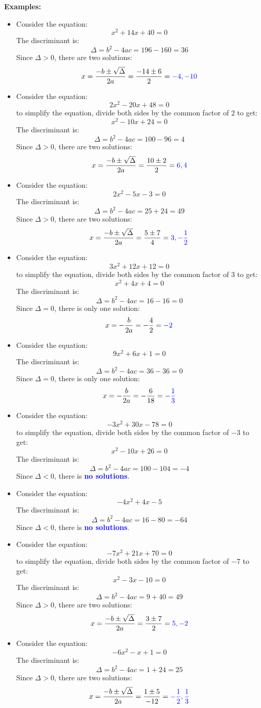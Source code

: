 \documentclass{article}
\newcommand{\dg}[1]{\textcolor{dark_green}{#1}}
\newcommand{\blue}[1]{\textcolor{blue}{#1}}
\begin{document}
\textbf{Examples:}
\begin{itemize}
\item Consider the equation:
\dg{\[x^2 + 14x + 40 = 0\]}
The discriminant is: 
\[\Delta = b^2 - 4ac = 196 - 160 = 36\]
Since \(\Delta > 0\), there are two solutions:
\[x = \frac{-b \pm \sqrt{\Delta}}{2a} = \frac{-14 \pm 6}{2} = \blue{-4, -10}\]
\item Consider the equation:
\dg{\[2x^2 - 20x + 48 = 0\]}
to simplify the equation, divide both sides by the common factor of \(2\) to get:
\[x^2 - 10x + 24 = 0\]
The discriminant is: 
\[\Delta = b^2 - 4ac = 100 - 96 = 4\]
Since \(\Delta > 0\), there are two solutions:
\[x = \frac{-b \pm \sqrt{\Delta}}{2a} = \frac{10 \pm 2}{2} = \blue{6, 4}\]
\item Consider the equation:
\dg{\[2x^2 - 5x - 3 = 0\]}
The discriminant is:
\[\Delta = b^2 - 4ac = 25 + 24 = 49\]
Since \(\Delta > 0\), there are two solutions:
\[x = \frac{-b \pm \sqrt{\Delta}}{2a} = \frac{5 \pm 7}{4} = \blue{3, -\frac{1}{2}}\]
\item Consider the equation:
\dg{\[3x^2 + 12x + 12 = 0\]}
to simplify the equation, divide both sides by the common factor of \(3\) to get:
\[x^2 + 4x + 4 = 0\]
The discriminant is:
\[\Delta = b^2 - 4ac = 16 - 16 = 0\]
Since \(\Delta = 0\), there is only one solution:
\[x = -\frac{b}{2a} = -\frac{4}{2} = \blue{-2}\]
\item Consider the equation:
\dg{\[9x^2 + 6x + 1 = 0\]}
The discriminant is:
\[\Delta = b^2 - 4ac = 36 - 36 = 0\]
Since \(\Delta = 0\), there is only one solution:
\[x = -\frac{b}{2a} = -\frac{6}{18} = \blue{-\frac{1}{3}}\]
\item Consider the equation:
\dg{\[-3x^2 + 30x - 78 = 0\]}
to simplify the equation, divide both sides by the common factor of \(-3\) to get:
\[x^2 - 10x + 26 = 0\]
The discriminant is:
\[\Delta = b^2 - 4ac = 100 - 104 = -4\]
Since \(\Delta < 0\), there is \blue{{\bf no solutions}}.
\item Consider the equation:
\dg{\[-4x^2 + 4x - 5\]}
The discriminant is:
\[\Delta = b^2 - 4ac = 16 - 80 = -64\]
Since \(\Delta < 0\), there is \blue{{\bf no solutions}}.
\item Consider the equation:
\dg{\[-7x^2 + 21x + 70 = 0\]}
to simplify the equation, divide both sides by the common factor of \(-7\) to get:
\[x^2 - 3x - 10 = 0\]
The discriminant is:
\[\Delta = b^2 - 4ac = 9 + 40 = 49\] 
Since \(\Delta > 0\), there are two solutions:
\[x = \frac{-b \pm \sqrt{\Delta}}{2a} = \frac{3 \pm 7}{2} = \blue{5, -2}\]
\item Consider the equation:
\dg{\[-6x^2 - x + 1 = 0\]}
The discriminant is:
\[\Delta = b^2 - 4ac = 1 + 24 = 25\]
Since \(\Delta > 0\), there are two solutions:
\[x = \frac{-b \pm \sqrt{\Delta}}{2a} = \frac{1 \pm 5}{-12} = \blue{-\frac{1}{2}, \frac{1}{3}}\]
\end{itemize}
\end{document}
